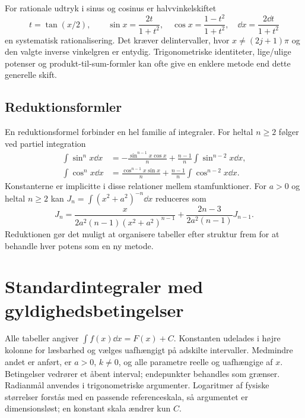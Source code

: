 For rationale udtryk i sinus og cosinus er halvvinkelskiftet
\[
 t=\tan(x/2),\qquad
 \sin x=\frac{2t}{1+t^2},\quad
 \cos x=\frac{1-t^2}{1+t^2},\quad
 \dd x=\frac{2\dd t}{1+t^2}
\]
en systematisk rationalisering. Det kræver delintervaller, hvor
$x\ne(2j+1)\pi$ og den valgte inverse vinkelgren er entydig. Trigonometriske
identiteter, lige/ulige potenser og produkt-til-sum-formler kan ofte give
en enklere metode end dette generelle skift.

\subsection{Reduktionsformler}
En reduktionsformel forbinder en hel familie af integraler. For heltal
$n\ge2$ følger ved partiel integration
\begin{align*}
 \int\sin^n x\dd x
 &=-\frac{\sin^{n-1}x\cos x}{n}
   +\frac{n-1}{n}\int\sin^{n-2}x\dd x,\\
 \int\cos^n x\dd x
 &=\frac{\cos^{n-1}x\sin x}{n}
   +\frac{n-1}{n}\int\cos^{n-2}x\dd x.
\end{align*}
Konstanterne er implicitte i disse relationer mellem stamfunktioner.
For $a>0$ og heltal $n\ge2$ kan
$J_n=\int(x^2+a^2)^{-n}\dd x$ reduceres som
\[
 J_n=\frac{x}{2a^2(n-1)(x^2+a^2)^{n-1}}
       +\frac{2n-3}{2a^2(n-1)}J_{n-1}.
\]
Reduktionen gør det muligt at organisere tabeller efter struktur frem for
at behandle hver potens som en ny metode.

\section{Standardintegraler med gyldighedsbetingelser}
\label{sec:standardintegraler}
Alle tabeller angiver $\int f(x)\dd x=F(x)+C$. Konstanten udelades i
højre kolonne for læsbarhed og vælges uafhængigt på adskilte intervaller.
Medmindre andet er anført, er $a>0$, $k\ne0$, og alle parametre reelle og
uafhængige af $x$. Betingelser vedrører et åbent interval; endepunkter
behandles som grænser. Radianmål anvendes i trigonometriske argumenter.
Logaritmer af fysiske størrelser forstås med en passende referenceskala,
så argumentet er dimensionsløst; en konstant skala ændrer kun $C$.

